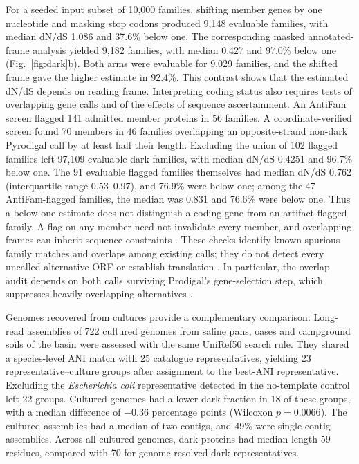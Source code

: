 \documentclass[11pt]{article}
\begin{document}
For a seeded input subset of 10{,}000 families, shifting member genes by one nucleotide and
masking stop codons produced 9{,}148 evaluable families, with median dN/dS 1.086 and 37.6\%
below one. The corresponding masked annotated-frame analysis yielded 9{,}182 families, with
median 0.427 and 97.0\% below one (Fig.~\ref{fig:dark}b). Both arms were evaluable for 9{,}029 families, and the shifted
frame gave the higher estimate in 92.4\%. This contrast shows that the estimated dN/dS
depends on reading frame. Interpreting coding status also requires tests of overlapping gene
calls and of the effects of sequence ascertainment.
An AntiFam screen flagged 141 admitted member proteins in 56 families. A coordinate-verified
screen found 70 members in 46 families overlapping an opposite-strand non-dark Pyrodigal call
by at least half their length. Excluding the union of 102 flagged families left 97{,}109
evaluable dark families, with median dN/dS 0.4251 and 96.7\% below one. The 91 evaluable flagged families themselves had median dN/dS 0.762 (interquartile range 0.53--0.97), and 76.9\% were below one; among the 47 AntiFam-flagged families, the median was 0.831 and 76.6\% were below one. Thus a below-one estimate does not distinguish a coding gene from an artifact-flagged family. A flag on any member need not invalidate every member, and overlapping frames can inherit sequence constraints \citep{nelson2020olgenie,yooseph2007gos}. These checks identify
known spurious-family matches and overlaps among existing calls; they do not detect every
uncalled alternative ORF or establish translation \citep{eberhardt2012antifam}. In particular, the overlap audit depends on both calls surviving Prodigal's gene-selection step, which suppresses heavily overlapping alternatives \citep{hyatt2010prodigal}.

Genomes recovered from cultures provide a complementary comparison. Long-read assemblies of
722 cultured genomes from saline pans, oases and campground soils of the basin were assessed
with the same UniRef50 search rule. They shared a species-level ANI match with 25 catalogue
representatives, yielding 23 representative--culture groups after assignment to the best-ANI
representative. Excluding the \emph{Escherichia coli} representative detected in the no-template
control left 22 groups. Cultured genomes had a lower dark fraction in 18 of these groups,
with a median difference of $-0.36$ percentage points (Wilcoxon $p = 0.0066$).
The cultured assemblies had a median of two contigs, and 49\% were single-contig assemblies.
Across all cultured genomes, dark proteins had median length 59 residues, compared with 70 for
genome-resolved dark representatives.
\end{document}
